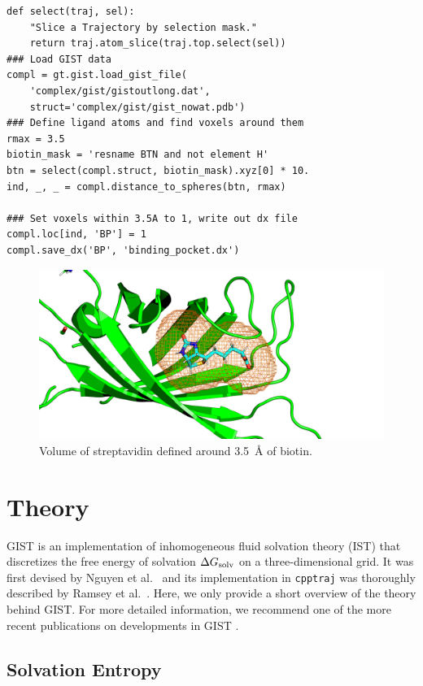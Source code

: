 \documentclass[9pt,tutorial]{livecoms}
\newcommand{\dgsolv}{\Delta G_\textup{solv}}
\newcommand{\software}{\texttt}
\begin{document}
\begin{lstlisting}[style=python]
def select(traj, sel):
	"Slice a Trajectory by selection mask."
	return traj.atom_slice(traj.top.select(sel))
### Load GIST data
compl = gt.gist.load_gist_file(
	'complex/gist/gistoutlong.dat', 
	struct='complex/gist/gist_nowat.pdb')
### Define ligand atoms and find voxels around them
rmax = 3.5
biotin_mask = 'resname BTN and not element H'
btn = select(compl.struct, biotin_mask).xyz[0] * 10.
ind, _, _ = compl.distance_to_spheres(btn, rmax)

### Set voxels within 3.5A to 1, write out dx file
compl.loc[ind, 'BP'] = 1
compl.save_dx('BP', 'binding_pocket.dx')
\end{lstlisting}

\begin{figure}
	\centering
	\includegraphics[width=1.0\linewidth]{streptavidin_bp_close.png}
	\caption{Volume of streptavidin defined around \SI{3.5}{\angstrom} of biotin. }\label{streptavidin_volume}
\end{figure}

\section{Theory}
\label{sec:theory}
GIST is an implementation of inhomogeneous fluid solvation theory (IST) \cite{Lazaridis1998} that discretizes the free energy of solvation $\dgsolv$ on a three-dimensional grid. 
It was first devised by Nguyen et al.\ \cite{Nguyen2012} and its implementation in \software{cpptraj} was thoroughly described by Ramsey et al.\ \cite{Ramsey2016}.
Here, we only provide a short overview of the theory behind GIST.
For more detailed information, we recommend one of the more recent publications on developments in GIST \cite{Kraml2020,Chen2021}.

\subsection{Solvation Entropy}
\end{document}
